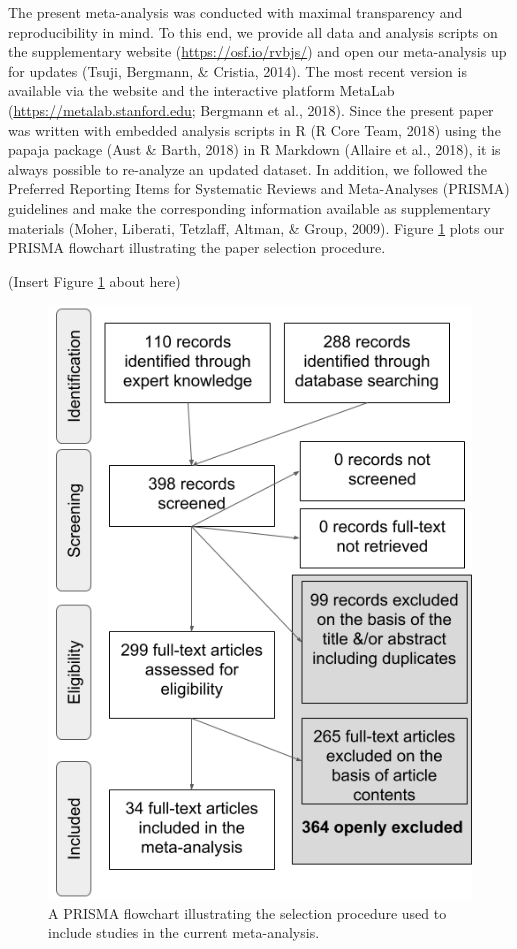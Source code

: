 \documentclass[man]{apa6}
\begin{document}
The present meta-analysis was conducted with maximal transparency and reproducibility in mind. To this end, we provide all data and analysis scripts on the supplementary website (\url{https://osf.io/rvbjs/}) and open our meta-analysis up for updates (Tsuji, Bergmann, \& Cristia, 2014). The most recent version is available via the website and the interactive platform MetaLab (\url{https://metalab.stanford.edu}; Bergmann et al., 2018). Since the present paper was written with embedded analysis scripts in R (R Core Team, 2018) using the papaja package (Aust \& Barth, 2018) in R Markdown (Allaire et al., 2018), it is always possible to re-analyze an updated dataset. In addition, we followed the Preferred Reporting Items for Systematic Reviews and Meta-Analyses (PRISMA) guidelines and make the corresponding information available as supplementary materials (Moher, Liberati, Tetzlaff, Altman, \& Group, 2009). Figure \ref{fig:PRISMA-image} plots our PRISMA flowchart illustrating the paper selection procedure.

(Insert Figure \ref{fig:PRISMA-image} about here)

\begin{figure}
\includegraphics[width=1\linewidth]{figures/Figure_1_PRISMA_MA_Mispronunciation} \caption{A PRISMA flowchart illustrating the selection procedure used to include studies in the current meta-analysis.}\label{fig:PRISMA-image}
\end{figure}
\end{document}
